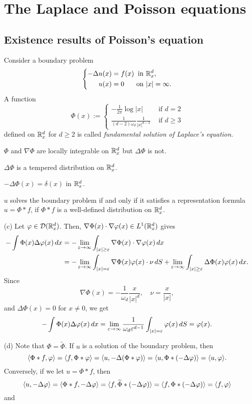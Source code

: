 \documentclass{../note}
\begin{document}
\chapter{The Laplace and Poisson equations}

\section{Existence results of Poisson's equation}
\begin{prb}
Consider a boundary problem
\[\left\{\begin{alignedat}{2}
-\Delta u(x)&=f(x) & \text{ in }&\mathbb{R}_x^d,\\
u(x)&=0 & \text{ on }&|x|=\infty.
\end{alignedat}\right.\]
A function
\[\Phi(x):=\begin{cases}-\frac1{2\pi}\log|x|&\text{ if }d=2\\\frac1{(d-2)\omega_d}\frac1{|x|^{d-2}}&\text{ if }d\ge3\end{cases}\]
defined on $\mathbb{R}_x^d$ for $d\ge2$ is called \emph{fundamental solution of Laplace's equation}.
\begin{parts}
\item $\Phi$ and $\nabla\Phi$ are locally integrable on $\mathbb{R}_x^d$ but $\Delta\Phi$ is not.
\item $\Delta\Phi$ is a tempered distribution on $\mathbb{R}_x^d$.
\item $-\Delta\Phi(x)=\delta(x)$ in $\mathbb{R}_x^d$.
\item $u$ solves the boundary problem if and only if it satisfies a representation formula $u=\Phi*f$, if $\Phi*f$ is a well-defined distribution on $\mathbb{R}_x^d$.
\end{parts}
\end{prb}
\begin{pf}
(c)
Let $\varphi\in\mathcal{D}(\mathbb{R}_x^d)$.
Then, $\nabla\Phi(x)\cdot\nabla\varphi(x)\in L^1(\mathbb{R}_x^d)$ gives
\begin{align*}
-\int\Phi(x)\Delta\varphi(x)\,dx
&=-\lim_{\varepsilon\to\infty}\int_{|x|\ge\varepsilon}\nabla\Phi(x)\cdot\nabla\varphi(x)\,dx\\
&=-\lim_{\varepsilon\to\infty}\int_{|x|=\varepsilon}\nabla\Phi(x)\varphi(x)\cdot\nu\,dS
+\lim_{\varepsilon\to\infty}\int_{|x|\ge\varepsilon}\Delta\Phi(x)\varphi(x)\,dx.
\end{align*}
Since
\[\nabla\Phi(x)=-\frac1{\omega_d}\frac x{|x|^d},\quad\nu=\frac x{|x|},\]
and $\Delta\Phi(x)=0$ for $x\ne0$, we get
\[-\int\Phi(x)\Delta\varphi(x)\,dx=\lim_{\varepsilon\to\infty}\frac1{\omega_d\varepsilon^{d-1}}\int_{|x|=\varepsilon}\varphi(x)\,dS=\varphi(x).\]

(d)
Note that $\Phi=\tilde\Phi$.
If $u$ is a solution of the boundary problem, then
\[\langle\Phi*f,\varphi\rangle=\langle f,\Phi*\varphi\rangle=\langle u,-\Delta(\Phi*\varphi)\rangle=\langle u,\Phi*(-\Delta\varphi)\rangle=\langle u,\varphi\rangle.\]
Conversely, if we let $u=\Phi*f$, then
\[\langle u,-\Delta\varphi\rangle=\langle\Phi*f,-\Delta\varphi\rangle=\langle f,\widetilde\Phi*(-\Delta\varphi)\rangle=\langle f,\Phi*(-\Delta\varphi)\rangle=\langle f,\varphi\rangle\]
and %
\end{pf}
\end{document}
